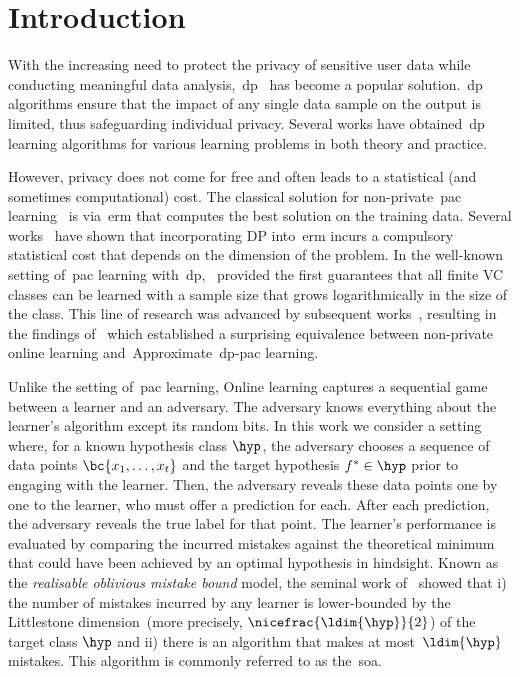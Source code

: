 \section{Introduction}\label{sec:intro}
\glsresetall
With the increasing need to protect the privacy of sensitive user data while conducting meaningful data analysis,~\Gls{dp}~\citep{dwork2006calibrating} has become a popular solution.~\Gls{dp} algorithms ensure that the impact of any single data sample on the output is limited, thus safeguarding individual privacy. Several works have obtained~\Gls{dp} learning algorithms for various learning problems in both theory and practice.

However, privacy does not come for free and often leads to a statistical (and sometimes computational) cost. The classical solution for non-private~\Gls{pac} learning~\citep{valiant1984theory} is via~\Gls{erm} that computes the best solution on the training data. Several works~\citep{bassily2014private,chaudhuri2011differentially} have shown that incorporating DP into~\Gls{erm} incurs a compulsory statistical cost that depends on the dimension of the problem. In the well-known setting of~\Gls{pac} learning with~\Gls{dp},~\citet{kasiviswanathan2011can} provided the first guarantees that all finite VC classes can be learned with a sample size that grows logarithmically in the size of the class. This line of research was advanced by subsequent works~\citep{beimel2013characterizing,feldman2014sample,beimel2014bounds}, resulting in the findings of~\citet{alon2022private} which established a surprising equivalence between non-private online learning and~Approximate~\Gls{dp}-\Gls{pac} learning.

Unlike the setting of~\Gls{pac} learning, Online learning captures a sequential game between a learner and an adversary. The adversary knows everything about the learner's algorithm except its random bits. In this work we consider a setting where, for a known hypothesis class \(\hyp\), the adversary chooses a sequence of data points \(\bc{x_1,\ldots,x_t}\) and the target hypothesis \(f^*\in\hyp\) prior to engaging with the learner. Then, the adversary reveals these data points one by one to the learner, who must offer a prediction for each. After each prediction, the adversary reveals the true label for that point. The learner's performance is evaluated by comparing the incurred mistakes against the theoretical minimum that could have been achieved by an optimal hypothesis in hindsight. Known as the \emph{realisable oblivious mistake bound} model, the seminal work of~\citet{littlestone1988learning} showed that i) the number of mistakes incurred by any learner is lower-bounded by the Littlestone dimension~(more precisely, \(\nicefrac{\ldim{\hyp}}{2}\)) of the target class \(\hyp\) and ii) there is an algorithm that makes at most~\(\ldim{\hyp}\) mistakes. This algorithm is commonly referred to as the~\Gls{soa}.

